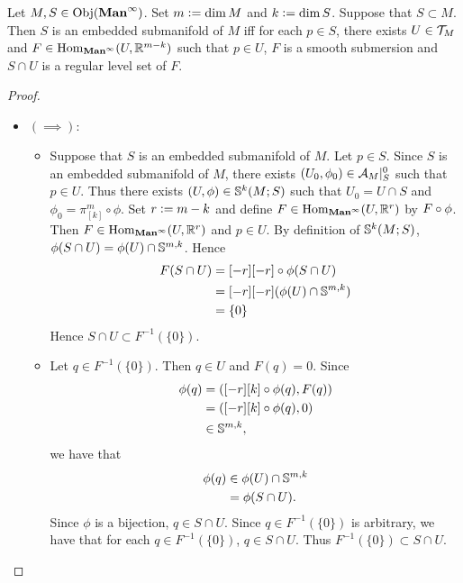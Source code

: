 \documentclass{book}
\begin{document}
	\begin{ex} 
		Let $M, S \in \Obj(\Maninf)$. Set $m \defeq \dim M$ and $k \defeq \dim S$. Suppose that $S \subset M$. Then $S$ is an embedded submanifold of $M$ iff for each $p \in S$, there exists $U \in \MT_M$ and $F \in \Hom_{\Maninf}(U, \R^{m-k})$ such that $p \in U$, $F$ is a smooth submersion and $S \cap U$ is a regular level set of $F$.
	\end{ex}

	\begin{proof}\
		\begin{itemize}
			\item $(\implies):$ \\
			\begin{itemize}
				\item Suppose that $S$ is an embedded submanifold of $M$. Let $p \in S$. Since $S$ is an embedded submanifold of $M$, there exists $(U_0, \phi_0) \in \MA_M|_S^0$ such that $p \in U$. Thus there exists $(U, \phi) \in \S^k(M; S)$ such that $U_0 = U \cap S$ and $\phi_0 = \pi^m_{[k]} \circ \phi$. Set $r \defeq m - k$ and define $F \in \Hom_{\Maninf}(U, \R^r)$ by $F \def \pi^m_{[-r]} \circ \phi$. Then $F \in \Hom_{\Maninf}(U, \R^r)$ and $p \in U$. By definition of $\S^k(M; S)$, $\phi(S \cap U) = \phi(U) \cap \S^{m,k}$. Hence 
				\begin{align*}
					F(S \cap U)
					& = \pi^m_{[-r]} \circ \phi(S \cap U) \\
					& = \pi^m_{[-r]} (\phi(U) \cap \S^{m,k}) \\
					& = \{0\} 
				\end{align*}
				Hence $S \cap U \subset F^{-1}(\{0\})$. 
				\item Let $q \in F^{-1}(\{0\})$. Then $q \in U$ and $F(q) = 0$. Since 
				\begin{align*}
					\phi(q)
					& = (\pi^m_{[k]} \circ \phi(q), F(q)) \\
					& = (\pi^m_{[k]} \circ \phi(q), 0) \\
					& \in \S^{m,k},
				\end{align*}
				we have that 
				\begin{align*}
					\phi(q) 
					& \in \phi(U) \cap \S^{m,k} \\
					& = \phi(S \cap U).
				\end{align*}
				Since $\phi$ is a bijection, $q \in S \cap U$. Since $q \in F^{-1}(\{0\})$ is arbitrary, we have that for each $q \in F^{-1}(\{0\})$, $q \in S \cap U$. Thus $F^{-1}(\{0\}) \subset S \cap U$.  

\end{itemize}
\end{itemize}
\end{proof}
\end{document}
